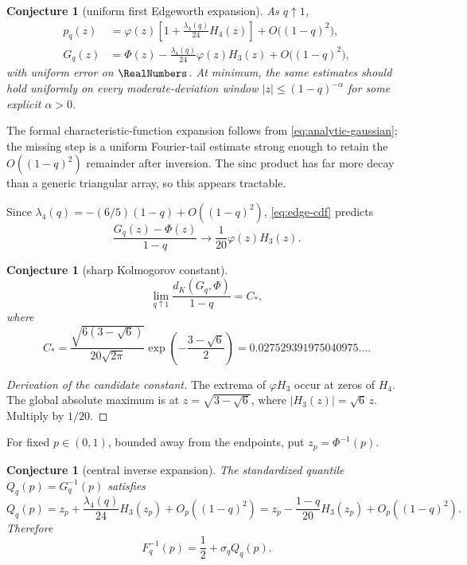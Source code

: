 \documentclass[11pt,oneside]{article}
\newtheorem{conjecture}[theorem]{Conjecture}
\theoremstyle{definition}
\theoremstyle{remark}
\newcommand{\PhiN}{\Phi}
\newcommand{\phiN}{\varphi}
\begin{document}
\begin{conjecture}[uniform first Edgeworth expansion]\label{conj:edgeworth}
As $q\uparrow1$,
\begin{align}
 p_q(z)&=\phiN(z)\left[1+\frac{\lambda_4(q)}{24}H_4(z)\right]
 +O\bigl((1-q)^2\bigr),\label{eq:edge-density}\\
 G_q(z)&=\PhiN(z)-\frac{\lambda_4(q)}{24}\phiN(z)H_3(z)
 +O\bigl((1-q)^2\bigr),\label{eq:edge-cdf}
\end{align}
with uniform error on $\RealNumbers$.  At minimum, the same estimates should hold uniformly on every moderate-deviation window $|z|\le (1-q)^{-\alpha}$ for some explicit $\alpha>0$.
\end{conjecture}

The formal characteristic-function expansion follows from \cref{eq:analytic-gaussian}; the missing step is a uniform Fourier-tail estimate strong enough to retain the $O((1-q)^2)$ remainder after inversion.  The sinc product has far more decay than a generic triangular array, so this appears tractable.

Since $\lambda_4(q)=-(6/5)(1-q)+O((1-q)^2)$, \cref{eq:edge-cdf} predicts
\begin{equation}\label{eq:edge-limit-profile}
 \frac{G_q(z)-\PhiN(z)}{1-q}
 \longrightarrow\frac1{20}\phiN(z)H_3(z).
\end{equation}

\begin{conjecture}[sharp Kolmogorov constant]\label{conj:sharp-kolmogorov}
\begin{equation}\label{eq:sharp-kolmogorov}
 \lim_{q\uparrow1}\frac{d_K(G_q,\PhiN)}{1-q}=C_*,
\end{equation}
where
\begin{equation}\label{eq:Cstar}
 C_*=\frac{\sqrt{6(3-\sqrt6)}}{20\sqrt{2\pi}}
 \exp\!\left(-\frac{3-\sqrt6}{2}\right)
 =0.027529391975040975\ldots.
\end{equation}
\end{conjecture}

\begin{proof}[Derivation of the candidate constant]
The extrema of $\phiN H_3$ occur at zeros of $H_4$.  The global absolute maximum is at
$z=\sqrt{3-\sqrt6}$, where $|H_3(z)|=\sqrt6\,z$.  Multiply by $1/20$.
\end{proof}

For fixed $p\in(0,1)$, bounded away from the endpoints, put $z_p=\PhiN^{-1}(p)$.

\begin{conjecture}[central inverse expansion]\label{conj:central-quantile}
The standardized quantile $Q_q(p)=G_q^{-1}(p)$ satisfies
\begin{equation}\label{eq:central-quantile}
 Q_q(p)=z_p+\frac{\lambda_4(q)}{24}H_3(z_p)+O_p((1-q)^2)
 =z_p-\frac{1-q}{20}H_3(z_p)+O_p((1-q)^2).
\end{equation}
Therefore
\[
 F_q^{-1}(p)=\frac12+\sigma_qQ_q(p).
\]
\end{conjecture}
\end{document}
